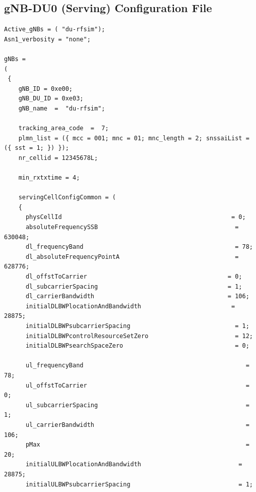 \subsection{gNB-DU0 (Serving) Configuration File}
\begin{lstlisting}[style=confstyle, caption=DU0 band78 PCI 0 Configuration]
Active_gNBs = ( "du-rfsim");
Asn1_verbosity = "none";

gNBs =
(
 {
    gNB_ID = 0xe00;
    gNB_DU_ID = 0xe03;
    gNB_name  =  "du-rfsim";

    tracking_area_code  =  7;
    plmn_list = ({ mcc = 001; mnc = 01; mnc_length = 2; snssaiList = ({ sst = 1; }) });
    nr_cellid = 12345678L;

    min_rxtxtime = 4;

    servingCellConfigCommon = (
    {
      physCellId                                               = 0;
      absoluteFrequencySSB                                      = 630048;
      dl_frequencyBand                                          = 78;
      dl_absoluteFrequencyPointA                                = 628776;
      dl_offstToCarrier                                       = 0;
      dl_subcarrierSpacing                                    = 1;
      dl_carrierBandwidth                                     = 106;
      initialDLBWPlocationAndBandwidth                         = 28875;
      initialDLBWPsubcarrierSpacing                             = 1;
      initialDLBWPcontrolResourceSetZero                        = 12;
      initialDLBWPsearchSpaceZero                               = 0;

      ul_frequencyBand                                             = 78;
      ul_offstToCarrier                                            = 0;
      ul_subcarrierSpacing                                         = 1;
      ul_carrierBandwidth                                          = 106;
      pMax                                                         = 20;
      initialULBWPlocationAndBandwidth                           = 28875;
      initialULBWPsubcarrierSpacing                              = 1;
      

\end{lstlisting}
